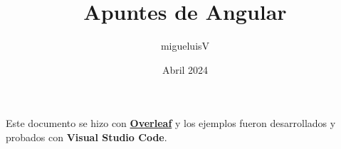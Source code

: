 \documentclass[12pt]{article}
\title{Apuntes de Angular}
\author{migueluisV}
\date{Abril 2024}
\begin{document}
\renewcommand*\contentsname{Índice}

\maketitle\newpage
\tableofcontents\newpage

\hspace{0.55cm}Este documento se hizo con \href{https://es.overleaf.com/}{\textbf{Overleaf}} y los ejemplos fueron desarrollados y probados con \textbf{Visual Studio Code}.






\end{document}

